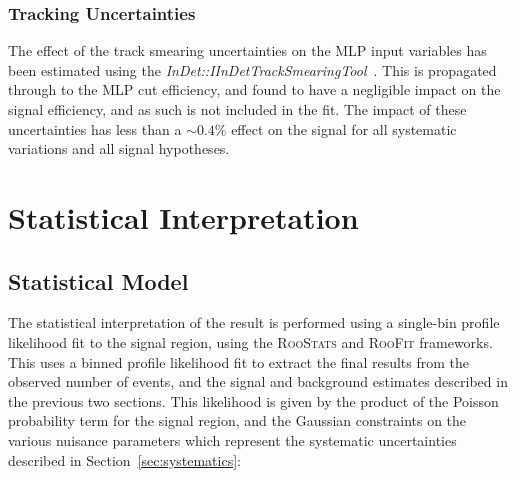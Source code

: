 \documentclass[NOTE, atlasdraft=true, texlive=2017, UKenglish]{\ATLASLATEXPATH atlasdoc}
\begin{document}






\subsubsection{Tracking Uncertainties}
\label{sec:systrack}

The effect of the track smearing uncertainties on the MLP input variables has been estimated using the \emph{InDet::IInDetTrackSmearingTool}~\cite{tracksystematics}. This is propagated through to the MLP cut efficiency, and found to have a negligible impact on the signal efficiency, and as such is not included in the fit. The impact of these uncertainties has less than a $\sim 0.4\%$ effect on the signal for all systematic variations and all signal hypotheses.


\clearpage
\section{Statistical Interpretation}
\label{sec:stats}

\subsection{Statistical Model}
\label{sec:statmodel}

The statistical interpretation of the result is performed using a single-bin profile likelihood fit to the signal region, using the \textsc{RooStats} and \textsc{RooFit} frameworks. This uses a binned profile likelihood fit to extract the final results from the observed number of events, and the signal and background estimates described in the previous two sections. This likelihood is given by the product of the Poisson probability term for the signal region, and the Gaussian constraints on the various nuisance parameters which represent the systematic uncertainties described in Section~\ref{sec:systematics}:
\end{document}
